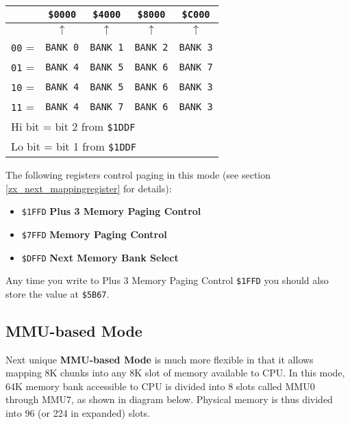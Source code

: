 \documentclass[twoside,openright,a4paper]{book}
\begin{document}
\begin{tabular}{ccccc}
	& {\tt \$0000} & {\tt \$4000} & {\tt \$8000} & {\tt \$C000} \\
	\hline
	& $\uparrow$ & $\uparrow$ & $\uparrow$ & $\uparrow$\\
	{\tt 00} = & {\tt BANK 0} & {\tt BANK 1} & {\tt BANK 2} & {\tt BANK 3} \\
	{\tt 01} = & {\tt BANK 4} & {\tt BANK 5} & {\tt BANK 6} & {\tt BANK 7} \\
	{\tt 10} = & {\tt BANK 4} & {\tt BANK 5} & {\tt BANK 6} & {\tt BANK 3} \\
	{\tt 11} = & {\tt BANK 4} & {\tt BANK 7} & {\tt BANK 6} & {\tt BANK 3} \\
	\multicolumn{5}{l}{Hi bit = bit 2 from {\tt \$1DDF}} \\
	\multicolumn{5}{l}{Lo bit = bit 1 from {\tt \$1DDF}} \\
\end{tabular}

The following registers control paging in this mode (see section \ref{zx_next_mappingregister} for details):

\begin{itemize}
	\item {\tt \$1FFD} \textbf{Plus 3 Memory Paging Control}
	\item {\tt \$7FFD} \textbf{Memory Paging Control}
	\item {\tt \$DFFD} \textbf{Next Memory Bank Select}
\end{itemize}

Any time you write to Plus 3 Memory Paging Control {\tt \$1FFD} you should also store the value at {\tt \$5B67}.

\pagebreak
\subsection{MMU-based Mode}

Next unique \textbf{MMU-based Mode} is much more flexible in that it allows mapping 8K chunks into any 8K slot of memory available to CPU. In this mode, 64K memory bank accessible to CPU is divided into 8 slots called MMU0 through MMU7, as shown in diagram below. Physical memory is thus divided into 96 (or 224 in expanded) slots.
\end{document}
